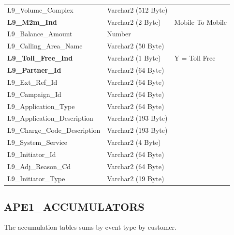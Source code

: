 \documentclass[12pt,twoside]{article}
\begin{document}
\begin{longtable}{l|l|l}
L9\_Volume\_Complex & Varchar2 (512 Byte) & \\
\textbf{L9\_M2m\_Ind} & Varchar2 (2 Byte) & Mobile To Mobile\\
L9\_Balance\_Amount & Number & \\
L9\_Calling\_Area\_Name & Varchar2 (50 Byte) & \\
\textbf{L9\_Toll\_Free\_Ind} & Varchar2 (1 Byte) & Y = Toll Free\\
\textbf{L9\_Partner\_Id} & Varchar2 (64 Byte) & \\
L9\_Ext\_Ref\_Id & Varchar2 (64 Byte) & \\
L9\_Campaign\_Id & Varchar2 (64 Byte) & \\
L9\_Application\_Type & Varchar2 (64 Byte) & \\
L9\_Application\_Description & Varchar2 (193 Byte) & \\
L9\_Charge\_Code\_Description & Varchar2 (193 Byte) & \\
L9\_System\_Service & Varchar2 (4 Byte) & \\
L9\_Initiator\_Id & Varchar2 (64 Byte) & \\
L9\_Adj\_Reason\_Cd & Varchar2 (64 Byte) & \\
L9\_Initiator\_Type & Varchar2 (19 Byte) & \\
\hline
\end{longtable}
\normalsize
\newpage 
\subsection{APE1\_ACCUMULATORS}
\label{sec:orgheadline37}
The accumulation tables sums by event type by customer.
\footnotesize
\end{document}
